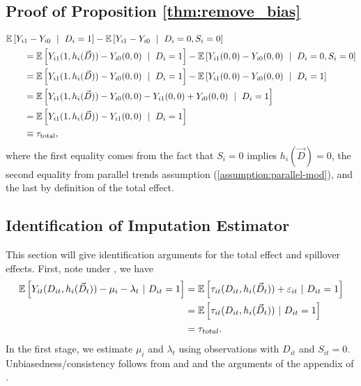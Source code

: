 \documentclass[11pt]{article}
\begin{document}
\subsection{Proof of Proposition \ref{thm:remove_bias}}

\begin{align*}
    &\expec{Y_{i1} - Y_{i0} \ \mid \ D_i = 1} - \expec{Y_{i1} - Y_{i0} \ \mid \ D_i = 0, S_i = 0} \\
    &\quad\quad= \expec{Y_{i1}(1, h_i(\vec{D})) - Y_{i0}(0,0) \ \mid \ D_i = 1} - \expec{Y_{i1}(0, 0) - Y_{i0}(0,0) \ \mid \ D_i = 0, S_i = 0} \\
    &\quad\quad= \expec{Y_{i1}(1, h_i(\vec{D})) - Y_{i0}(0,0) \ \mid \ D_i = 1} - \expec{Y_{i1}(0, 0) - Y_{i0}(0,0) \ \mid \ D_i = 1} \\
    &\quad\quad= \expec{Y_{i1}(1, h_i(\vec{D})) - Y_{i0}(0,0) - Y_{i1}(0, 0) + Y_{i0}(0,0) \ \mid \ D_i = 1} \\
    &\quad\quad= \expec{Y_{i1}(1, h_i(\vec{D})) - Y_{i1}(0, 0) \ \mid \ D_i = 1} \\
    &\quad\quad\equiv \tau_{\text{total}},
\end{align*}
where the first equality comes from the fact that $S_i = 0$ implies $h_i(\vec{D}) = 0$, the second equality from parallel trends assumption (\ref{assumption:parallel-mod}), and the last by definition of the total effect.


\subsection{Identification of Imputation Estimator}

This section will give identification arguments for the total effect and spillover effects. First, note under , we have 
\begin{align*}
  \mathbb{E}\left[Y_{it}(D_{it}, h_i(\vec{D}_t)) - \mu_i - \lambda_t \ | \ D_{it} = 1\right] 
  &= \mathbb{E}\left[\tau_{it}(D_{it}, h_i(\vec{D}_t)) + \varepsilon_{it} \ | \ D_{it} = 1\right] \\
  &= \mathbb{E}\left[\tau_{it}(D_{it}, h_i(\vec{D}_t)) \ | \ D_{it} = 1\right] \\
  &= \tau_{total}.
\end{align*}
In the first stage, we estimate $\mu_i$ and $\lambda_t$ using observations with $D_{it}$ and $S_{it} = 0$. Unbiasedness/consistency follows from  and  and the arguments of the appendix of \citet{Gardner_2021}.
\end{document}
